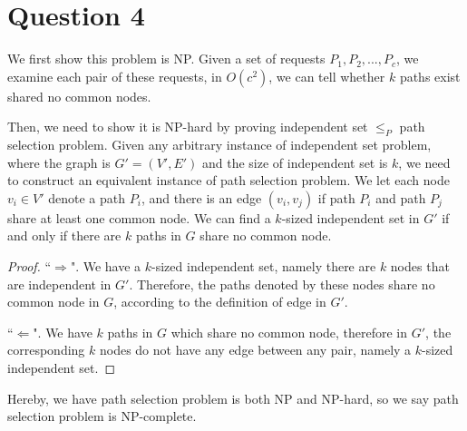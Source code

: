 \documentclass[letter,12pt]{article}
\begin{document}
\section*{Question 4}
We first show this problem is NP. Given a set of requests $P_1, P_2, ..., P_c$, we 
examine each pair of these requests, in $O(c^2)$, we can tell whether $k$ paths exist
shared no common nodes.

Then, we need to show it is NP-hard by proving independent set $\le_P$ path selection
problem. Given any arbitrary instance of independent set problem, where the graph
is $G' = (V', E')$ and the size of independent set is $k$, we need to construct an 
equivalent instance of path selection problem. We let each node $v_i \in V'$ denote
a path $P_i$, and there is an edge $(v_i, v_j)$ if path $P_i$ and path $P_j$ share at 
least one common node. We can find a $k$-sized independent set in $G'$ if and only
if there are $k$ paths in $G$ share no common node.

\begin{proof}
``$\Rightarrow$". We have a $k$-sized independent set, namely there are $k$ nodes
that are independent in $G'$. Therefore, the paths denoted by these nodes share no 
common node in $G$, according to the definition of edge in $G'$.

``$\Leftarrow$". We have $k$ paths in $G$ which share no common node, therefore
in $G'$, the corresponding $k$ nodes do not have any edge between any pair, namely
a $k$-sized independent set.
\end{proof}

Hereby, we have path selection problem is both NP and NP-hard, so we say path 
selection problem is NP-complete.
\end{document}
